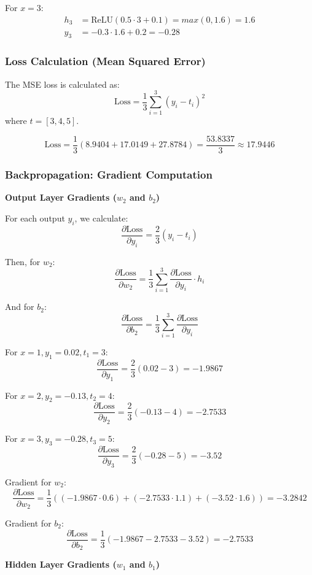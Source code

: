 \documentclass{article}
\begin{document}
For \( x = 3 \):
\begin{align*}
    h_3 &= \text{ReLU}(0.5 \cdot 3 + 0.1) = max(0, 1.6) = 1.6 \\
    y_3 &= -0.3 \cdot 1.6 + 0.2 = -0.28
\end{align*}

\subsubsection*{Loss Calculation (Mean Squared Error)}

The MSE loss is calculated as:
\[
\text{Loss} = \frac{1}{3} \sum_{i=1}^{3} (y_i - t_i)^2
\]
where \( t = [3, 4, 5] \).

\[
\text{Loss} = \frac{1}{3} (8.9404 + 17.0149 + 27.8784) = \frac{53.8337}{3} \approx 17.9446
\]

\subsubsection*{Backpropagation: Gradient Computation}
\textbf{Output Layer Gradients (\( w_2 \) and \( b_2 \))}

For each output \( y_i \), we calculate:
\[
\frac{\partial \text{Loss}}{\partial y_i} = \frac{2}{3} (y_i - t_i)
\]

Then, for \( w_2 \):
\[
\frac{\partial \text{Loss}}{\partial w_2} = \frac{1}{3} \sum_{i=1}^{3} \frac{\partial \text{Loss}}{\partial y_i} \cdot h_i
\]

And for \( b_2 \):
\[
\frac{\partial \text{Loss}}{\partial b_2} = \frac{1}{3} \sum_{i=1}^{3} \frac{\partial \text{Loss}}{\partial y_i}
\]


For \( x = 1, y_1 = 0.02, t_1 = 3 \):
\[
\frac{\partial \text{Loss}}{\partial y_1} = \frac{2}{3} (0.02 - 3) = -1.9867
\]

For \( x = 2, y_2 = -0.13, t_2 = 4 \):
\[
\frac{\partial \text{Loss}}{\partial y_2} = \frac{2}{3} (-0.13 - 4) = -2.7533
\]

For \( x = 3, y_3 = -0.28, t_3 = 5 \):
\[
\frac{\partial \text{Loss}}{\partial y_3} = \frac{2}{3} (-0.28 - 5) = -3.52
\]

Gradient for \( w_2 \):
\[
\frac{\partial \text{Loss}}{\partial w_2} = \frac{1}{3} ((-1.9867 \cdot 0.6) + (-2.7533 \cdot 1.1) + (-3.52 \cdot 1.6)) = -3.2842
\]

Gradient for \( b_2 \):
\[
\frac{\partial \text{Loss}}{\partial b_2} = \frac{1}{3} (-1.9867 - 2.7533 - 3.52) = -2.7533
\]

\vspace{10pt}
\hspace{-20pt}
\textbf{Hidden Layer Gradients (\( w_1 \) and \( b_1 \))}
\end{document}
